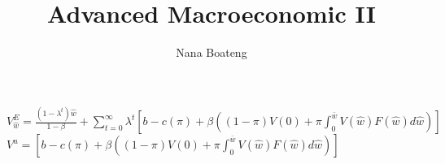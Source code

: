 \documentclass[11pt]{article}
\title{Advanced Macroeconomic II}
\author{Nana Boateng}
\date{}
\begin{document}
\maketitle

$V_{\hat{w}}^{E}=\frac{(1-\lambda^{t}) \hat{w}}{1-\beta}+\sum_{t=0}^{\infty}\lambda^{t}\left[ b-c(\pi)+\beta \left ((1-\pi)V(0)+\pi\int_{0}^{\bar{w}}V(\hat{w}) F(\hat{w})d\hat{w} \right)\right]$\\

$V^{u}=\left[ b-c(\pi)+\beta \left ((1-\pi)V(0)+\pi\int_{0}^{\bar{w}}V(\hat{w}) F(\hat{w})d\hat{w} \right)\right]$\\
\end{document}
